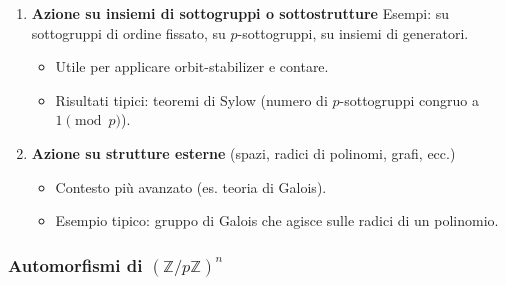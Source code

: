 \documentclass[11pt]{article}
\theoremstyle{style}
\numberwithin{equation}{subsection}
\renewcommand{\textbf}[1]{\textsf{\bfseries #1}}
\begin{document}
\begin{enumerate}
  \item \textbf{Azione su insiemi di sottogruppi o sottostrutture}  
  Esempi: su sottogruppi di ordine fissato, su \(p\)-sottogruppi, su insiemi di generatori.  
  \begin{itemize}
    \item Utile per applicare orbit-stabilizer e contare.  
    \item Risultati tipici: teoremi di Sylow (numero di \(p\)-sottogruppi congruo a \(1 \pmod p\)).
  \end{itemize}

  \item \textbf{Azione su strutture esterne} (spazi, radici di polinomi, grafi, ecc.)  
  \begin{itemize}
    \item Contesto più avanzato (es. teoria di Galois).  
    \item Esempio tipico: gruppo di Galois che agisce sulle radici di un polinomio.
  \end{itemize}
\end{enumerate}

\subsubsection{Automorfismi di $(\mathbb{Z}/p\mathbb{Z})^n$}
\end{document}
